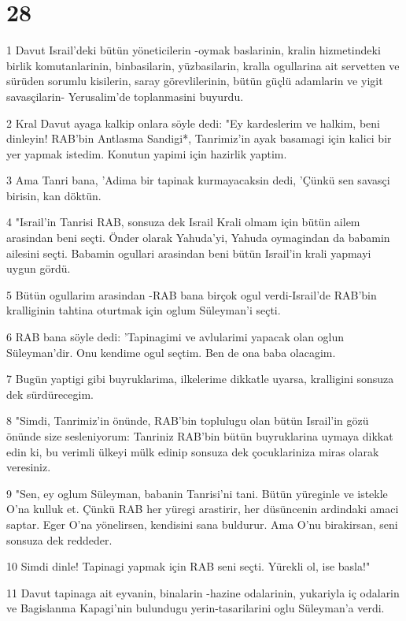 \chapter{28}

\par 1 Davut Israil'deki bütün yöneticilerin -oymak baslarinin, kralin hizmetindeki birlik komutanlarinin, binbasilarin, yüzbasilarin, kralla ogullarina ait servetten ve sürüden sorumlu kisilerin, saray görevlilerinin, bütün güçlü adamlarin ve yigit savasçilarin- Yerusalim'de toplanmasini buyurdu.
\par 2 Kral Davut ayaga kalkip onlara söyle dedi: "Ey kardeslerim ve halkim, beni dinleyin! RAB'bin Antlasma Sandigi*, Tanrimiz'in ayak basamagi için kalici bir yer yapmak istedim. Konutun yapimi için hazirlik yaptim.
\par 3 Ama Tanri bana, 'Adima bir tapinak kurmayacaksin dedi, 'Çünkü sen savasçi birisin, kan döktün.
\par 4 "Israil'in Tanrisi RAB, sonsuza dek Israil Krali olmam için bütün ailem arasindan beni seçti. Önder olarak Yahuda'yi, Yahuda oymagindan da babamin ailesini seçti. Babamin ogullari arasindan beni bütün Israil'in krali yapmayi uygun gördü.
\par 5 Bütün ogullarim arasindan -RAB bana birçok ogul verdi-Israil'de RAB'bin kralliginin tahtina oturtmak için oglum Süleyman'i seçti.
\par 6 RAB bana söyle dedi: 'Tapinagimi ve avlularimi yapacak olan oglun Süleyman'dir. Onu kendime ogul seçtim. Ben de ona baba olacagim.
\par 7 Bugün yaptigi gibi buyruklarima, ilkelerime dikkatle uyarsa, kralligini sonsuza dek sürdürecegim.
\par 8 "Simdi, Tanrimiz'in önünde, RAB'bin toplulugu olan bütün Israil'in gözü önünde size sesleniyorum: Tanriniz RAB'bin bütün buyruklarina uymaya dikkat edin ki, bu verimli ülkeyi mülk edinip sonsuza dek çocuklariniza miras olarak veresiniz.
\par 9 "Sen, ey oglum Süleyman, babanin Tanrisi'ni tani. Bütün yüreginle ve istekle O'na kulluk et. Çünkü RAB her yüregi arastirir, her düsüncenin ardindaki amaci saptar. Eger O'na yönelirsen, kendisini sana buldurur. Ama O'nu birakirsan, seni sonsuza dek reddeder.
\par 10 Simdi dinle! Tapinagi yapmak için RAB seni seçti. Yürekli ol, ise basla!"
\par 11 Davut tapinaga ait eyvanin, binalarin -hazine odalarinin, yukariyla iç odalarin ve Bagislanma Kapagi'nin bulundugu yerin-tasarilarini oglu Süleyman'a verdi.
